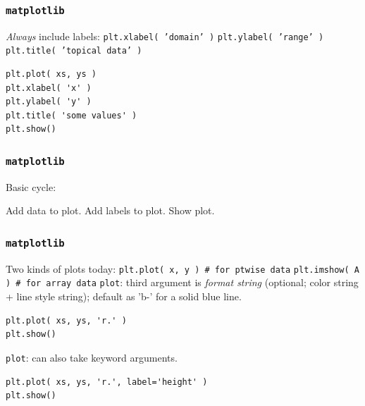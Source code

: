 \documentclass[11pt]{beamer}
\begin{document}
\begin{frame}[fragile]
  \frametitle{\texttt{matplotlib}}
  \Enlarge

  \begin{enumerate}
  \myitem  \emph{Always} include labels:
  \mysubitem  \texttt{plt.xlabel( 'domain' )}
  \mysubitem  \texttt{plt.ylabel( 'range' )}
  \mysubitem  \texttt{plt.title( 'topical data' )}
  \end{enumerate}
  \begin{Verbatim}
plt.plot( xs, ys )
plt.xlabel( 'x' )
plt.ylabel( 'y' )
plt.title( 'some values' )
plt.show()
  \end{Verbatim}
\end{frame}

\begin{frame}[fragile]
  \frametitle{\texttt{matplotlib}}
  \Enlarge

  \begin{enumerate}
  \myitem  Basic cycle:
    \begin{enumerate}
    \mysubitem  Add data to plot.
    \mysubitem  Add labels to plot.
    \mysubitem  Show plot.
    \end{enumerate}
  \end{enumerate}
\end{frame}

\begin{frame}[fragile]
  \frametitle{\texttt{matplotlib}}
  \Enlarge

  \begin{enumerate}
    \myitem  Two kinds of plots today:
    \mysubitem  \texttt{plt.plot( x, y )  \# for ptwise data}
    \mysubitem  \texttt{plt.imshow( A )   \# for array data}
    \myitem  \texttt{plot}:  third argument is \emph{format string} (optional; color string + line style string); default as  'b-' for a solid blue line. 
  \end{enumerate}
  \begin{Verbatim}
plt.plot( xs, ys, 'r.' )
plt.show()
  \end{Verbatim}
  \begin{enumerate}
    \myitem  \texttt{plot}:  can also take keyword arguments.
  \end{enumerate}
  \begin{Verbatim}
plt.plot( xs, ys, 'r.', label='height' )
plt.show()
  \end{Verbatim}
\end{frame}
\end{document}
